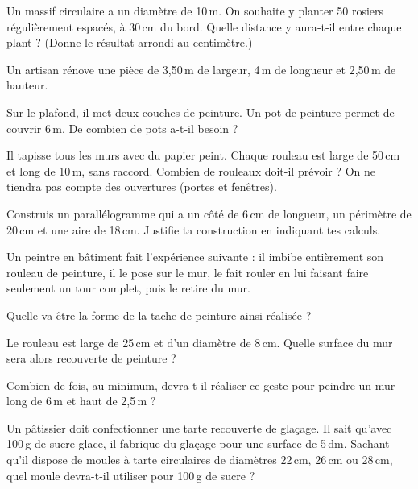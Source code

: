 \begin{exercice}[]
Un massif circulaire a un diamètre de 10\,m. On souhaite y planter 50 rosiers régulièrement espacés, à 30\,cm du bord. Quelle distance y aura‑t‑il entre chaque plant ? (Donne le résultat arrondi au centimètre.)
\end{exercice}

\begin{exercice}[]
Un artisan rénove une pièce de 3,50\,m de largeur, 4\,m de longueur et 2,50\,m de hauteur. 

\begin{colenumerate}{1} 
\item Sur le plafond, il met deux couches de peinture. Un pot de peinture permet de couvrir 6\,m. De combien de pots a-t-il besoin ?
\item Il tapisse tous les murs avec du papier peint. Chaque rouleau est large de 50\,cm et long de 10\,m, sans raccord. Combien de rouleaux doit-il prévoir ? On ne tiendra pas compte des ouvertures (portes et fenêtres).
\end{colenumerate} 
\end{exercice}

\begin{exercice}[]
Construis un parallélogramme qui a un côté de 6\,cm de longueur, un périmètre de 20\,cm et une aire de 18\,cm. Justifie ta construction en indiquant tes calculs.
\end{exercice}

\begin{exercice}
Un peintre en bâtiment fait l’expérience suivante : il imbibe entièrement son rouleau de peinture, il le pose sur le mur, le fait rouler en lui faisant faire seulement un tour complet, puis le retire du mur.

\begin{colenumerate}{1} 
\item Quelle va être la forme de la tache de peinture ainsi réalisée ?
\item Le rouleau est large de 25\,cm et d’un diamètre de 8\,cm. Quelle surface du mur sera alors recouverte de peinture ?
\item Combien de fois, au minimum, devra-t-il réaliser ce geste pour peindre un mur long de 6\,m et haut de 2,5\,m ?
\end{colenumerate} 
\end{exercice}


\begin{exercice}[La galette]
Un pâtissier doit confectionner une tarte recouverte de glaçage. Il sait qu'avec 100\,g de sucre glace, il fabrique du glaçage pour une surface de 5\,dm. Sachant qu'il dispose de moules à tarte circulaires de diamètres 22\,cm, 26\,cm ou 28\,cm, quel moule devra-t-il utiliser pour 100\,g de sucre ?
\end{exercice}


